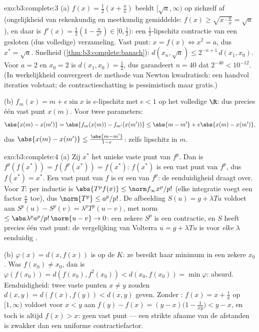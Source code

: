\begin{solution}{exo:b3:complete:3}
(a) $f(x) = \frac12(x + \frac ax)$ beeldt $[\sqrt a, \infty)$ op
zichzelf af (ongelijkheid van rekenkundig en meetkundig
gemiddelde: $f(x) \geq \sqrt{x \cdot \frac ax} = \sqrt a$), en
daar is $f'(x) = \frac12(1 - \frac a{x^2}) \in [0, \frac12)$: een
$\frac12$-lipschitz contractie van een gesloten (dus volledige)
verzameling. Vast punt: $x = f(x) \iff x^2 = a$, dus $x^* = \sqrt
a$. Snelheid (\cref{thm:b3:complete:banach}): $d(x_n, \sqrt a)
\leq 2^{-n+1}\,d(x_1, x_0)$. Voor $a = 2$ en $x_0 = 2$ is $d(x_1,
x_0) = \frac12$, dus garandeert $n = 40$ dat $2^{-40} <
10^{-12}$. (In werkelijkheid convergeert de methode van Newton
kwadratisch: een handvol iteraties volstaat; de contractieschatting
is pessimistisch maar gratis.)

(b) $f_m(x) = m + e\sin x$ is $e$-lipschitz met $e < 1$ op het
volledige $\R$: dus precies één vast punt $x(m)$. Voor twee
parameters:
\[
\abs{x(m) - x(m')} = \abs{f_m(x(m)) - f_{m'}(x(m'))}
\leq \abs{m - m'} + e\abs{x(m) - x(m')},
\]
dus $\abs{x(m) - x(m')} \leq \frac{\abs{m - m'}}{1 - e}$: zelfs
lipschitz in $m$.
\end{solution}

\begin{solution}{exo:b3:complete:4}
(a) Zij $x^*$ het unieke vaste punt van $f^p$. Dan is
$f^p(f(x^*)) = f(f^p(x^*)) = f(x^*)$: $f(x^*)$ is een vast punt
van $f^p$, dus $f(x^*) = x^*$. Een vast punt van $f$ is er een van
$f^p$: de eenduidigheid draagt over. Voor $T$: per inductie is
$\abs{T^pf(x)} \leq \norm f_\infty x^p/p!$ (elke integratie voegt
een factor $\frac xk$ toe), dus $\norm{T^p} \leq a^p/p!$. De
afbeelding $S(u) = g + \lambda Tu$ voldoet aan $S^p(u) - S^p(v) =
\lambda^pT^p(u - v)$, met norm $\leq \abs\lambda^pa^p/p!\,\norm{u
- v} \to 0$: een zekere $S^p$ is een contractie, en $S$ heeft
precies één vast punt: de vergelijking van Volterra $u = g +
\lambda Tu$ is voor \emph{elke} $\lambda$ eenduidig .

(b) $\varphi(x) = d(x, f(x))$ is  op de  $K$: ze
bereikt haar minimum in een zekere $x_0$. Was $f(x_0) \neq x_0$,
dan is $\varphi(f(x_0)) = d(f(x_0), f^2(x_0)) < d(x_0, f(x_0)) =
\min\varphi$: absurd. Eenduidigheid: twee vaste punten $x \ne y$
zouden $d(x,y) = d(f(x), f(y)) < d(x,y)$ geven. Zonder
: $f(x) = x + \frac1x$ op $[1, \infty)$ voldoet voor $x
< y$ aan $f(y) - f(x) = (y - x)\bigl(1 - \frac1{xy}\bigr) < y -
x$, en toch is altijd $f(x) > x$: geen vast punt --- een strikte
afname van de afstanden is zwakker dan een uniforme
contractiefactor.
\end{solution}

